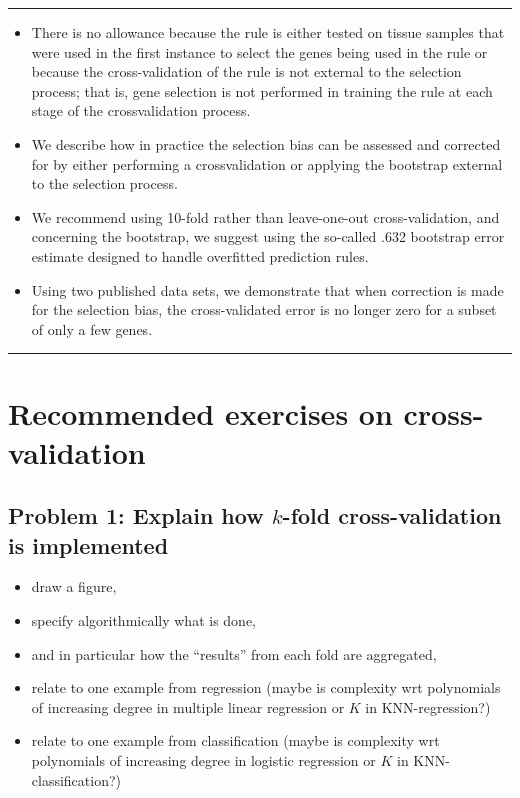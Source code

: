 \documentclass[]{article}
\providecommand{\tightlist}{%
  \setlength{\itemsep}{0pt}\setlength{\parskip}{0pt}}
\begin{document}
\begin{center}\rule{0.5\linewidth}{\linethickness}\end{center}

\begin{itemize}
\tightlist
\item
  There is no allowance because the rule is either tested on tissue
  samples that were used in the first instance to select the genes being
  used in the rule or because the cross-validation of the rule is not
  external to the selection process; that is, gene selection is not
  performed in training the rule at each stage of the crossvalidation
  process.
\item
  We describe how in practice the selection bias can be assessed and
  corrected for by either performing a crossvalidation or applying the
  bootstrap external to the selection process.
\item
  We recommend using 10-fold rather than leave-one-out cross-validation,
  and concerning the bootstrap, we suggest using the so-called .632
  bootstrap error estimate designed to handle overfitted prediction
  rules.
\item
  Using two published data sets, we demonstrate that when correction is
  made for the selection bias, the cross-validated error is no longer
  zero for a subset of only a few genes.
\end{itemize}

\begin{center}\rule{0.5\linewidth}{\linethickness}\end{center}

\hypertarget{recommended-exercises-on-cross-validation}{%
\section{Recommended exercises on
cross-validation}\label{recommended-exercises-on-cross-validation}}

\hypertarget{problem-1-explain-how-k-fold-cross-validation-is-implemented}{%
\subsection{\texorpdfstring{Problem 1: Explain how \(k\)-fold
cross-validation is
implemented}{Problem 1: Explain how k-fold cross-validation is implemented}}\label{problem-1-explain-how-k-fold-cross-validation-is-implemented}}

\begin{itemize}
\tightlist
\item
  draw a figure,
\item
  specify algorithmically what is done,
\item
  and in particular how the ``results'' from each fold are aggregated,
\item
  relate to one example from regression (maybe is complexity wrt
  polynomials of increasing degree in multiple linear regression or
  \(K\) in KNN-regression?)
\item
  relate to one example from classification (maybe is complexity wrt
  polynomials of increasing degree in logistic regression or \(K\) in
  KNN-classification?)
\end{itemize}
\end{document}
